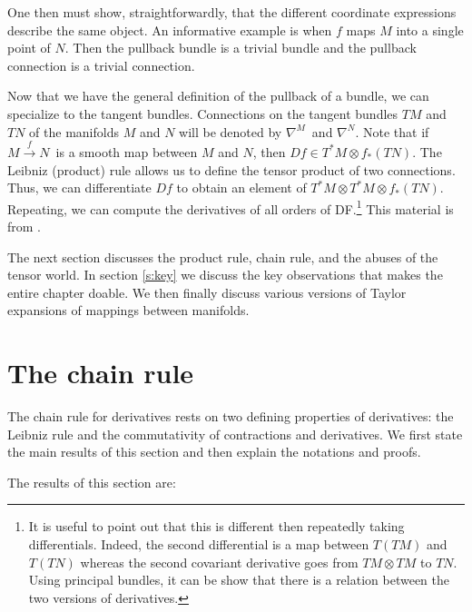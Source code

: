 \documentclass[11pt]{article}
\theoremstyle{remark}
\begin{document}
One
then must show, straightforwardly, that  the different coordinate expressions
describe the same object.
An informative example  is when $f$ maps
$M$ into a single point of $N$. Then the pullback bundle is a trivial
bundle and the pullback connection is a trivial connection.  

Now that we have the general definition of the pullback of a bundle,
we can specialize to the tangent bundles. Connections on the tangent
bundles $TM$ and $TN$ of the manifolds $M$ and $N$ will be denoted by
\ensuremath{\nabla^{M}_{} {}}\ and \ensuremath{\nabla^{N}_{} {}}. Note that if \ensuremath{{M} \overset{f}{\rightarrow} {N}}\ is a
smooth map between $M$ and $N$, then $Df \in \ensuremath{T^* M} \otimes
\ensuremath{{f}_{*}({TN})}$. The Leibniz (product) rule allows us to define the tensor
product of two connections. Thus, we can differentiate $Df$ to obtain
an element of $\ensuremath{T^* M} \otimes \ensuremath{T^* M} \otimes \ensuremath{{f}_{*}({TN})}$. 
Repeating, we can compute the derivatives of all orders of DF.\footnote{ 
It is useful to point out that 
this is 
different then repeatedly taking  differentials. Indeed, the second
differential 
is a map between $T(TM)$ and $T(TN)$ whereas the second covariant
derivative goes from $TM \otimes TM$ to $TN$. 
Using principal bundles, it can be show that there is a relation
between the two versions of derivatives.} This material is from
\cite{EL83}.


The next section discusses the product rule, chain rule, and the
abuses of the tensor world. 
In section \ref{s:key} we discuss the key
observations that makes the entire chapter doable. We then finally discuss
various versions of Taylor expansions of mappings between manifolds. 

\section{The chain rule} \label{s:chain}

The chain rule for derivatives rests on two defining properties of
derivatives: the Leibniz rule and the commutativity of contractions
and derivatives. We first state the main results of this section 
and then explain the
notations and proofs. 


The results of this section are:
\end{document}
